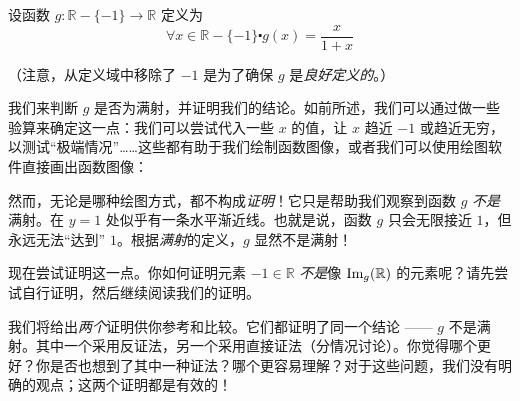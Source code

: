 \begin{example}
    设函数 $g : \mathbb{R} - \{-1\} \to \mathbb{R}$ 定义为
    \[\forall x \in \mathbb{R} - \{-1\} \centerdot g(x) = \frac{x}{1+x}\]

    （注意，从定义域中移除了 $-1$ 是为了确保 $g$ 是\emph{良好定义的}。）

    我们来判断 $g$ 是否为满射，并证明我们的结论。如前所述，我们可以通过做一些验算来确定这一点：我们可以尝试代入一些 $x$ 的值，让 $x$ 趋近 $-1$ 或趋近无穷，以测试``极端情况''……这些都有助于我们绘制函数图像，或者我们可以使用绘图软件直接画出函数图像：

    \begin{center}
    \end{center}

    然而，无论是哪种绘图方式，都不构成\emph{证明}！它只是帮助我们观察到函数 $g$ \emph{不是}满射。在 $y = 1$ 处似乎有一条水平渐近线。也就是说，函数 $g$ 只会无限接近 $1$，但永远无法``达到'' $1$。根据\emph{满射}的定义，$g$ 显然不是满射！

    现在尝试证明这一点。你如何证明元素 $-1 \in \mathbb{R}$ \emph{不是}像 $\text{Im}_g(\mathbb{R})$ 的元素呢？请先尝试自行证明，然后继续阅读我们的证明。

    我们将给出\emph{两个}证明供你参考和比较。它们都证明了同一个结论 —— $g$ 不是满射。其中一个采用反证法，另一个采用直接证法（分情况讨论）。你觉得哪个更好？你是否也想到了其中一种证法？哪个更容易理解？对于这些问题，我们没有明确的观点；这两个证明都是有效的！


\end{example}
